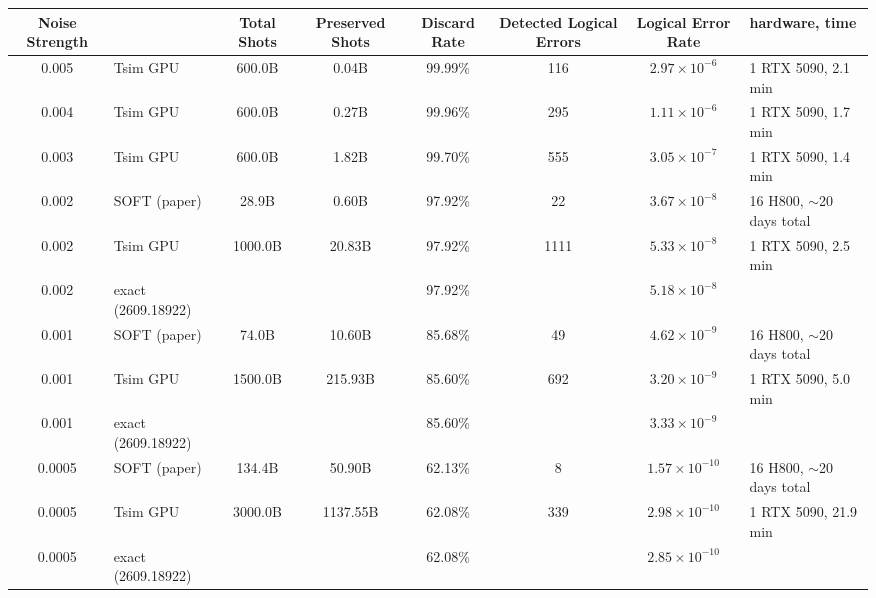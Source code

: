 \begin{tabular}{c l c c c c c l}
\toprule
Noise Strength & & Total Shots & Preserved Shots & Discard Rate & Detected Logical Errors & Logical Error Rate & hardware, time\\
\midrule
0.005 & Tsim GPU & 600.0B & 0.04B & 99.99\% & 116 & $2.97\times 10^{-6}$ & 1 RTX 5090, 2.1 min \\
\midrule
0.004 & Tsim GPU & 600.0B & 0.27B & 99.96\% & 295 & $1.11\times 10^{-6}$ & 1 RTX 5090, 1.7 min \\
\midrule
0.003 & Tsim GPU & 600.0B & 1.82B & 99.70\% & 555 & $3.05\times 10^{-7}$ & 1 RTX 5090, 1.4 min \\
\midrule
0.002 & SOFT (paper) & 28.9B & 0.60B & 97.92\% & 22 & $3.67\times 10^{-8}$ & 16 H800, $\sim$20 days total \\
0.002 & Tsim GPU & 1000.0B & 20.83B & 97.92\% & 1111 & $5.33\times 10^{-8}$ & 1 RTX 5090, 2.5 min \\
0.002 & exact (2609.18922) & & & 97.92\% & & $5.18\times 10^{-8}$ & \\
\midrule
0.001 & SOFT (paper) & 74.0B & 10.60B & 85.68\% & 49 & $4.62\times 10^{-9}$ & 16 H800, $\sim$20 days total \\
0.001 & Tsim GPU & 1500.0B & 215.93B & 85.60\% & 692 & $3.20\times 10^{-9}$ & 1 RTX 5090, 5.0 min \\
0.001 & exact (2609.18922) & & & 85.60\% & & $3.33\times 10^{-9}$ & \\
\midrule
0.0005 & SOFT (paper) & 134.4B & 50.90B & 62.13\% & 8 & $1.57\times 10^{-10}$ & 16 H800, $\sim$20 days total \\
0.0005 & Tsim GPU & 3000.0B & 1137.55B & 62.08\% & 339 & $2.98\times 10^{-10}$ & 1 RTX 5090, 21.9 min \\
0.0005 & exact (2609.18922) & & & 62.08\% & & $2.85\times 10^{-10}$ & \\
\bottomrule
\end{tabular}

